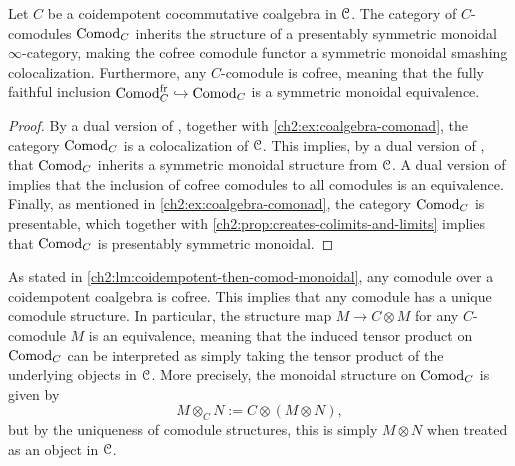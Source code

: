 \begin{lemma}
    \label{ch2:lm:coidempotent-then-comod-monoidal}
    Let $C$ be a coidempotent cocommutative coalgebra in $\EuScript{C}$. The category of $C$-comodules $\mathrm{Comod}_C$ inherits the structure of a presentably symmetric monoidal $\infty$-category, making the cofree comodule functor a symmetric monoidal smashing colocalization. Furthermore, any $C$-comodule is cofree, meaning that the fully faithful inclusion $\mathrm{Comod}_C^{\mathrm{fr}} \hookrightarrow \mathrm{Comod}_C$ is a symmetric monoidal equivalence. 
\end{lemma}
\begin{proof}
    By a dual version of \cite[4.8.2.4]{Lurie_HA}, together with \cref{ch2:ex:coalgebra-comonad}, the category $\mathrm{Comod}_C$ is a colocalization of $\EuScript{C}$. This implies, by a dual version of \cite[4.8.2.7]{Lurie_HA}, that $\mathrm{Comod}_C$ inherits a symmetric monoidal structure from $\EuScript{C}$. A dual version of \cite[4.8.2.10]{Lurie_HA} implies that the inclusion of cofree comodules to all comodules is an equivalence. Finally, as mentioned in \cref{ch2:ex:coalgebra-comonad}, the category $\mathrm{Comod}_C$ is presentable, which together with \cref{ch2:prop:creates-colimits-and-limits} implies that $\mathrm{Comod}_C$ is presentably symmetric monoidal. 
\end{proof}

\begin{remark}
    \label{ch2:rm:unique-structure}
    As stated in \cref{ch2:lm:coidempotent-then-comod-monoidal}, any comodule over a coidempotent coalgebra is cofree. This implies that any comodule has a unique comodule structure. In particular, the structure map $M \to C\otimes M$ for any $C$-comodule $M$ is an equivalence, meaning that the induced tensor product on $\mathrm{Comod}_C$ can be interpreted as simply taking the tensor product of the underlying objects in $\EuScript{C}$. More precisely, the monoidal structure on $\mathrm{Comod}_C$ is given by 
    \[M\otimes_C N := C\otimes (M\otimes N),\] 
    but by the uniqueness of comodule structures, this is simply $M\otimes N$ when treated as an object in $\EuScript{C}$. 
\end{remark}

